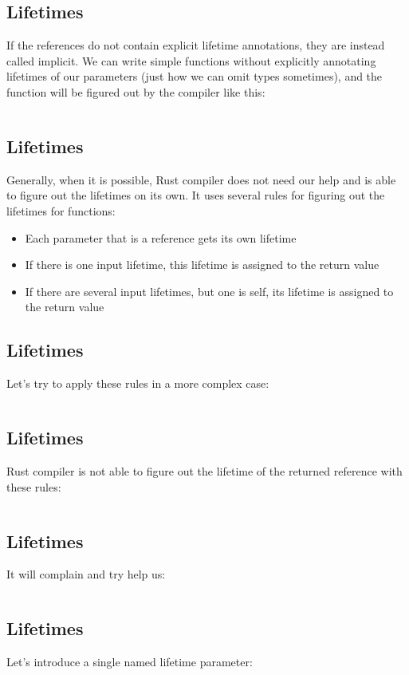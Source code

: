 \documentclass[usenames,twocolumn,dvipsnames,10pt,a4wide]{article}
\begin{document}
\subsection{Lifetimes}
	If the references do not contain explicit lifetime annotations,
	they are instead called implicit. We can write simple functions
	without explicitly annotating lifetimes of our parameters (just
	how we can omit types sometimes), and the function will be
	figured out by the compiler like this:
	\inputminted[fontsize=\normalsize]{rust}{code/lifetimes3.rs}


\subsection{Lifetimes}
	Generally, when it is possible, Rust compiler does not need
	our help and is able to figure out the lifetimes on its own.
	It uses several rules for figuring out the lifetimes for functions:
	\begin{itemize}[label=$\bullet$]
		\item Each parameter that is a reference gets its own lifetime
		\item If there is one input lifetime, this lifetime is assigned
			to the return value
		\item If there are several input lifetimes, but one is self,
			its lifetime is assigned to the return value
	\end{itemize}


\subsection{Lifetimes}
	Let's try to apply these rules in a more complex case:
	\inputminted[fontsize=\normalsize]{rust}{code/lifetimes4.rs}


\subsection{Lifetimes}
	Rust compiler is not able to figure out the lifetime
	of the returned reference with these rules:
	\inputminted[fontsize=\normalsize]{rust}{code/lifetimes5.rs}


\subsection{Lifetimes}
	It will complain and try help us:
	\inputminted[fontsize=\normalsize]{rust}{code/lifetimes6.rs}


\subsection{Lifetimes}
	Let's introduce a single named lifetime parameter:
	\inputminted[fontsize=\normalsize]{rust}{code/lifetimes7.rs}
\end{document}
